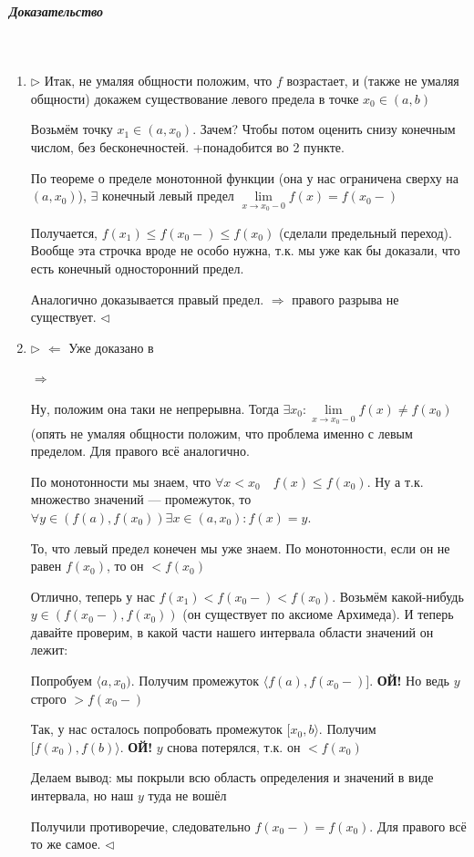 \documentclass{article}
\let\vanillasubparagraph\subparagraph
\renewcommand{\subparagraph}[1]{\vanillasubparagraph{#1}\mbox{}\\}
\begin{document}
\subparagraph{Доказательство}
\begin{enumerate}
\item $\rhd$
Итак, не умаляя общности положим, что $f$ возрастает, и (также не умаляя общности) докажем существование левого предела в точке $x_0 \in (a, b)$

Возьмём точку $x_1 \in (a, x_0)$. Зачем? Чтобы потом оценить снизу конечным числом, без бесконечностей. +понадобится во 2 пункте.

По теореме о пределе монотонной функции (она у нас ограничена сверху на $(a, x_0)$), $\exists$ конечный левый предел $\lim\limits_{x\rightarrow x_0-0}f(x) = f(x_0-)$

Получается, $f(x_1) \le f(x_0-) \le f(x_0)$ (сделали предельный переход). Вообще эта строчка вроде не особо нужна, т.к. мы уже как бы доказали, что есть конечный односторонний предел.

Аналогично доказывается правый предел. $\Rightarrow$ правого разрыва не существует.
$\lhd$

\item $\rhd$
$\Leftarrow$ Уже доказано в 

$\Rightarrow$

Ну, положим она таки не непрерывна. Тогда $\exists x_0 : \lim\limits_{x\rightarrow x_0-0} f(x) \ne f(x_0)$ (опять не умаляя общности положим, что проблема именно с левым пределом. Для правого всё аналогично.

По монотонности мы знаем, что $\forall x < x_0 \quad f(x) \le f(x_0)$. Ну а т.к. множество значений --- промежуток, то $\forall y \in (f(a), f(x_0)) \exists x\in (a, x_0) : f(x) = y$. 

То, что левый предел конечен мы уже знаем. По монотонности, если он не равен $f(x_0)$, то он $< f(x_0)$

Отлично, теперь у нас $f(x_1) < f(x_0-) < f(x_0)$. Возьмём какой-нибудь $y \in (f(x_0-), f(x_0))$ (он существует по аксиоме Архимеда). И теперь давайте проверим, в какой части нашего интервала области значений он лежит:

Попробуем $\langle a, x_0)$. Получим промежуток $\langle f(a), f(x_0-)]$. \textbf{ОЙ!} Но ведь $y$ строго $>f(x_0-)$ 

Так, у нас осталось попробовать промежуток $[x_0, b \rangle$. Получим $[f(x_0), f(b) \rangle$. \textbf{ОЙ!} $y$ снова потерялся, т.к. он $< f(x_0)$ 

Делаем вывод: мы покрыли всю область определения и значений в виде интервала, но наш $y$ туда не вошёл \Frowny \Frowny \Frowny

Получили противоречие, следовательно $f(x_0-) = f(x_0)$. Для правого всё то же самое.
$\lhd$
\end{enumerate}
\end{document}
